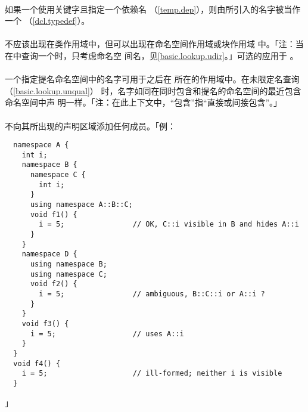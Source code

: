 \paragraph{}
如果一个使用关键字且指定一个依赖名
（\ref{temp.dep}），则由所引入的名字被当作一个
（\ref{dcl.typedef}）。



\paragraph{}
不应该出现在类作用域中，但可以出现在命名空间作用域或块作用域
中。「注：当在中查询一个时，只考虑命名空
间名，见\ref{basic.lookup.udir}。」可选的应用于
。

\paragraph{}
一个指定提名命名空间中的名字可用于之后在
所在的作用域中。在未限定名查询（\ref{basic.lookup.unqual}）
时，名字如同在同时包含和提名的命名空间的最近包含命名空间中声
明一样。「注：在此上下文中，``包含''指``直接或间接包含''。」

\paragraph{}
不向其所出现的声明区域添加任何成员。「例：
\begin{lstlisting}
  namespace A {
    int i;
    namespace B {
      namespace C {
        int i;
      }
      using namespace A::B::C;
      void f1() {
        i = 5;                // OK, C::i visible in B and hides A::i
      }
    }
    namespace D {
      using namespace B;
      using namespace C;
      void f2() {
        i = 5;                // ambiguous, B::C::i or A::i ?
      }
    }
    void f3() {
      i = 5;                  // uses A::i
    }
  }
  void f4() {
    i = 5;                    // ill-formed; neither i is visible
  }
\end{lstlisting}」

